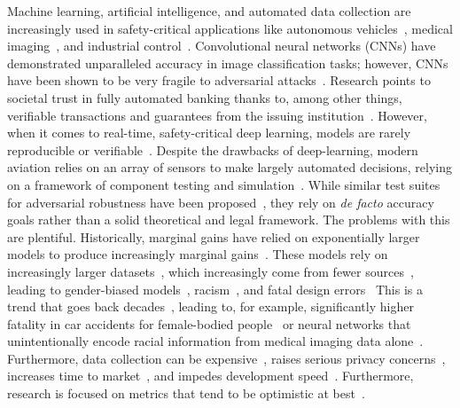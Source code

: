 \documentclass[journal]{IEEEtran}
\begin{document}
Machine learning, artificial intelligence, and automated data collection are increasingly used in safety-critical applications like autonomous vehicles~\cite{grigorescu2020survey,al2017deep}, medical imaging~\cite{ching2017opportunities,sahiner2019deep}, and industrial control~\cite{fukuda1992theory,monmasson2011fpgas}.
Convolutional neural networks (CNNs) have demonstrated unparalleled accuracy in image classification tasks; however, CNNs have been shown to be very fragile to adversarial attacks~\cite{miller_adversarial_2020,finlayson2018adversarial}.
Research points to societal trust in fully automated banking thanks to, among other things, verifiable transactions and guarantees from the issuing institution~\cite{safetyframework}.
However, when it comes to real-time, safety-critical deep learning, models are rarely reproducible or verifiable~\cite{tsipras_robustness_2019,carlini_towards_2017}.
Despite the drawbacks of deep-learning, modern aviation relies on an array of sensors to make largely automated decisions, relying on a framework of component testing and simulation~\cite{aviation}.
While similar test suites for adversarial robustness have been proposed~\cite{carlini_towards_2017,chakraborty_adversarial_2018}, they rely on \textit{de facto} accuracy goals rather than a solid theoretical and legal framework.
The problems with this are plentiful.
Historically, marginal gains have relied on exponentially larger models to produce increasingly marginal gains~\cite{desislavov2021compute}.
These models rely on increasingly larger datasets~\cite{desislavov2021compute,vapnik1994measuring,blumer1989learnability}, which increasingly come from fewer sources~\cite{koch2021reduced}, leading to gender-biased models~\cite{lu2020gender}, racism~\cite{buolamwini2018gender}, and fatal design errors~\cite{banks2018driver} This is a trend that goes back decades~\cite{corsaro1982something,ramirez2000resource,buolamwini2018gender}, leading to, for example, significantly higher fatality in car accidents for female-bodied people~\cite{evans2001gender} or neural networks that unintentionally encode racial information from medical imaging data alone~\cite{gichoya2022ai}.
Furthermore, data collection can be expensive~\cite{roh2019survey}, raises serious privacy concerns~\cite{bloom2017self}, increases time to market~\cite{lam2004new}, and impedes development speed~\cite{zirger1996effect}.
Furthermore, research is focused on metrics that tend to be optimistic at best~\cite{madry2017towards}.
\end{document}
